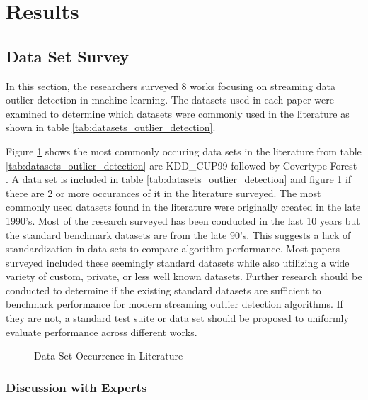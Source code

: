 \section{Results}
\label{ref_results}

\subsection{Data Set Survey}
In this section, the researchers surveyed 8 works focusing on streaming data outlier detection in machine learning. The datasets used in each paper were examined to determine which datasets were commonly used in the literature as shown in table \ref{tab:datasets_outlier_detection}. 



Figure \ref{fig_dataset_lit} shows the most commonly occuring data sets in the literature from table \ref{tab:datasets_outlier_detection} are KDD\_CUP99 \cite{kdd1999} followed by Covertype-Forest \cite{covertype-dataset}. A data set is included in table \ref{tab:datasets_outlier_detection} and figure \ref{fig_dataset_lit} if there are 2 or more occurances of it in the literature surveyed. The most commonly used datasets found in the literature were originally created in the late 1990's. Most of the research surveyed has been conducted in the last 10 years but the standard benchmark datasets are from the late 90's. This suggests a lack of standardization in data sets to compare algorithm performance. Most papers surveyed included these seemingly standard datasets while also utilizing a wide variety of custom, private, or less well known datasets. Further research should be conducted to determine if the existing standard datasets are sufficient to benchmark performance for modern streaming outlier detection algorithms. If they are not, a standard test suite or data set should be proposed to uniformly evaluate performance across different works.

\begin{figure}[h]
    \centering
    \caption{Data Set Occurrence in Literature }
    \label{fig_dataset_lit}
\end{figure}

\subsubsection{Discussion with Experts}

